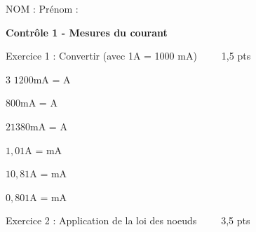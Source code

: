 \documentclass[11pt,a4paper]{article}
\begin{document}


\begin{mybox1}
NOM : \hfill Prénom : \hfill ~~
\end{mybox1}

\vfill
\begin{mybox}
\begin{center}

\textbf{
\Large 
Contrôle 1 - Mesures du courant
}
\end{center}
\end{mybox}

\vfill 

\begin{mybox1}
Exercice 1 : Convertir (avec 1A = 1000 mA) ~ \hfill ~~ 1,5 pts
\end{mybox1}

\vspace{3mm}

\begin{multicols}{3}
$1200$mA = \dotfill A 
\vspace{5mm}

$800$mA = \dotfill A 
\vspace{5mm}

$21380$mA = \dotfill A 
\vspace{5mm}

$1,01$A = \dotfill mA
\vspace{5mm}

$10,81$A = \dotfill mA
\vspace{5mm}

$0,801$A = \dotfill mA
\vspace{5mm}
    
\end{multicols}


\begin{mybox1}
    Exercice 2 : Application de la loi des noeuds ~ \hfill ~~ 3,5 pts
\end{mybox1}
\end{document}

